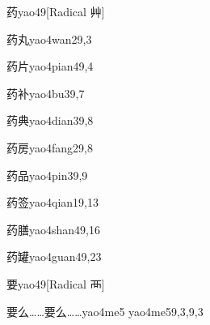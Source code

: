 \begin{verbete}{药}{yao4}{9}[Radical 艸]
\end{verbete}

\begin{verbete}{药丸}{yao4wan2}{9,3}
\end{verbete}

\begin{verbete}{药片}{yao4pian4}{9,4}
\end{verbete}

\begin{verbete}{药补}{yao4bu3}{9,7}
\end{verbete}

\begin{verbete}{药典}{yao4dian3}{9,8}
\end{verbete}

\begin{verbete}{药房}{yao4fang2}{9,8}
\end{verbete}

\begin{verbete}{药品}{yao4pin3}{9,9}
\end{verbete}

\begin{verbete}{药签}{yao4qian1}{9,13}
\end{verbete}

\begin{verbete}{药膳}{yao4shan4}{9,16}
\end{verbete}

\begin{verbete}{药罐}{yao4guan4}{9,23}
\end{verbete}

\begin{verbete}{要}{yao4}{9}[Radical 襾]
\end{verbete}

\begin{verbete}{要么……要么……}{yao4me5 yao4me5}{9,3,9,3}
\end{verbete}

